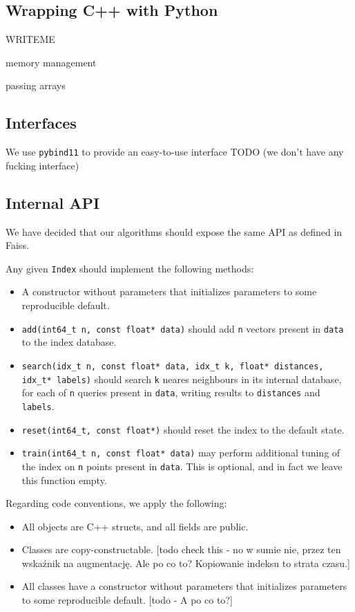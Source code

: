 \subsection{Wrapping C++ with Python}

WRITEME

memory management

passing arrays

\subsection{Interfaces}

We use \texttt{pybind11} to provide an easy-to-use interface
TODO (we don't have any fucking interface)

\subsection{Internal API}

We have decided that our algorithms should expose the same API as defined in Faiss.

Any given \texttt{Index} should implement the following methods:
\begin{itemize}

\item A constructor without parameters that initializes parameters to some reproducible default.

\item \texttt{add(int64\_t n, const float* data)} 
should add \texttt{n} vectors present in \texttt{data} to the index database.

\item \texttt{search(idx\_t n, const float* data, idx\_t k, float* distances, idx\_t* labels)} 
should search \texttt{k} neares neighbours 
in its internal database, for each of \texttt{n} queries present in \texttt{data}, writing results to \texttt{distances} and \texttt{labels}.

\item \texttt{reset(int64\_t, const float*)} 
should reset the index to the default state.

\item \texttt{train(int64\_t n, const float* data)} 
may perform additional tuning of the index on \texttt{n} points present in \texttt{data}. This is
optional, and in fact we leave this function empty.

\end{itemize}

Regarding code conventions, we apply the following:

\begin{itemize}
\item All objects are C++ structs, and all fields are public.
\item Classes are copy-constructable. [todo check this - no w sumie nie, przez ten wskaźnik na augmentację. Ale po co to? Kopiowanie indeksu to strata czasu.]
\item All classes have a constructor without parameters that initializes parameters to some reproducible default. [todo - A po co to?]
\end{itemize}
